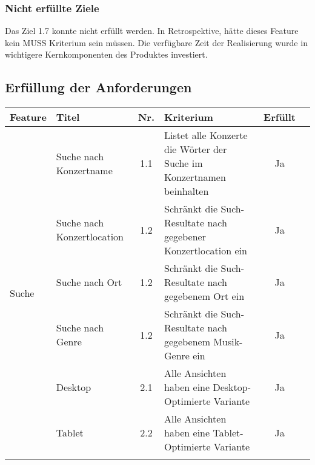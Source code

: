 \subsubsection{Nicht erfüllte Ziele}

Das Ziel 1.7 konnte nicht erfüllt werden. In Retrospektive, hätte dieses
Feature kein MUSS Kriterium sein müssen. Die verfügbare Zeit der Realisierung
wurde in wichtigere Kernkomponenten des Produktes investiert.

\clearpage
\subsection{Erfüllung der Anforderungen}

\begin{longtable}[]{@{}p{1.9cm}p{2.5cm}cp{5.5cm}cc@{}}
  \toprule
  \textbf{Feature}                & \textbf{Titel}             & \textbf{Nr.} & \textbf{Kriterium}                                                                                          & \textbf{Erfüllt}\tabularnewline
  \midrule
  \endhead
  \multirow{10}{*}{Suche}         & Suche nach Konzertname     & 1.1          & Listet alle Konzerte die Wörter der Suche im Konzertnamen beinhalten                                        & Ja                              \\ \cline{2-6}
                                  & Suche nach Konzertlocation & 1.2          & Schränkt die Such-Resultate nach gegebener Konzertlocation ein                                              & Ja                              \\ \cline{2-6}
                                  & Suche nach Ort             & 1.2          & Schränkt die Such-Resultate nach gegebenem Ort ein                                                          & Ja                              \\ \cline{2-6}
                                  & Suche nach Genre           & 1.2          & Schränkt die Such-Resultate nach gegebenem Musik-Genre ein                                                  & Ja                              \\
  \midrule
  \multirow{8}{*}{Design}         & Desktop                    & 2.1          & Alle Ansichten haben eine Desktop-Optimierte Variante                                                       & Ja                              \\ \cline{2-6}
                                  & Tablet                     & 2.2          & Alle Ansichten haben eine Tablet-Optimierte Variante                                                        & Ja                              \\ \cline{2-6}

\end{longtable}
